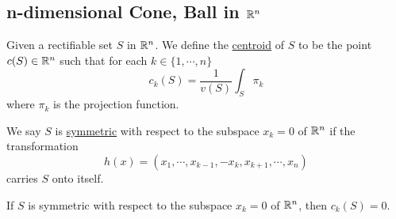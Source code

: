 \subsection{n-dimensional Cone, Ball in $\mathbb{R}^n$}

\begin{definition}
    Given a rectifiable set $S$ in $\mathbb{R}^n$. We define the \underline{centroid} of $S$ to be the point $c(S)\in \mathbb{R}^n$ such that
    for each $k\in\{1,\cdots,n\}$ $$c_k(S)=\frac{1}{v(S)}\int_S\pi_k$$ where $\pi_k$ is the projection function.
\end{definition}

\begin{definition}
    We say $S$ is \underline{symmetric} with respect to the subspace $x_k=0$ of $\mathbb{R}^n$ if the transformation $$h(x)=(x_1,\cdots,x_{k-1},-x_k,x_{k+1},\cdots,x_n)$$ carries $S$ onto itself.
\end{definition}

\begin{theorem}
    If $S$ is symmetric with respect to the subspace $x_k=0$ of $\mathbb{R}^n$, then $c_k(S)=0$.
\end{theorem}

